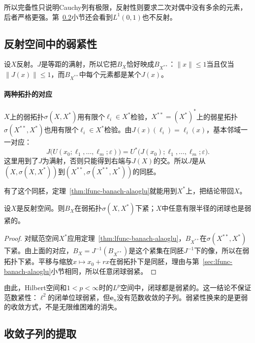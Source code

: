 所以完备性只说明Cauchy列有极限，反射性则要求二次对偶中没有多余的元素，后者严格更强。第~\ref{sec:lfunc-subsequences}小节还会看到$L^1(0,1)$也不反射。

\subsection{反射空间中的弱紧性}
\label{sec:lfunc-reflexive-weak-compact}

设$X$反射。$J$是等距的满射，所以它把$B_X$恰好映成$B_{X^{**}}$：$\lVert x\rVert\leq1$当且仅当$\lVert J(x)\rVert\leq1$，而$B_{X^{**}}$中每个元素都是某个$J(x)$。

\paragraph{两种拓扑的对应}
$X$上的弱拓扑$\sigma(X,X^*)$用有限个$\ell_i\in X^*$检验，$X^{**}=(X^*)^*$上的弱星拓扑$\sigma(X^{**},X^*)$也用有限个$\ell_i\in X^*$检验。由$J(x)(\ell_i)=\ell_i(x)$，基本邻域一一对应：
\[
J\bigl(U(x_0;\ell_1,\ldots,\ell_m;\varepsilon)\bigr)=U^*\bigl(J(x_0);\ell_1,\ldots,\ell_m;\varepsilon\bigr).
\]
这里用到了$J$为满射，否则只能得到右端与$J(X)$的交。所以$J$是从$(X,\sigma(X,X^*))$到$(X^{**},\sigma(X^{**},X^*))$的同胚。

有了这个同胚，定理~\ref{thm:lfunc-banach-alaoglu}就能用到$X^*$上，把结论带回$X$。

\begin{theorem}[反射空间中闭球的弱紧性]
\label{thm:lfunc-reflexive-weak-compact}
设$X$是反射空间。则$B_X$在弱拓扑$\sigma(X,X^*)$下紧；$X$中任意有限半径的闭球也是弱紧的。
\end{theorem}

\begin{proof}
对赋范空间$X^*$应用定理~\ref{thm:lfunc-banach-alaoglu}，$B_{X^{**}}$在$\sigma(X^{**},X^*)$下紧。由上面的对应，$B_X=J^{-1}(B_{X^{**}})$是这个紧集在同胚$J^{-1}$下的像，所以在弱拓扑下紧。平移与缩放$x\mapsto x_0+rx$在弱拓扑下是同胚，理由与第~\ref{sec:lfunc-banach-alaoglu}小节相同，所以任意闭球弱紧。
\end{proof}

由此，Hilbert空间和$1<p<\infty$时的$L^p$空间中，闭球都是弱紧的。这一结论不保证范数紧性：$\ell^2$的闭单位球弱紧，但$\bm e_n$没有范数收敛的子列。弱紧性换来的是更弱的收敛方式，不是无限维困难的消失。

\subsection{收敛子列的提取}
\label{sec:lfunc-subsequences}

